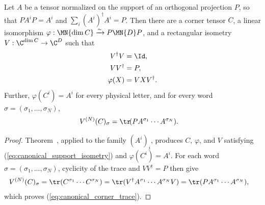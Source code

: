 \begin{lemma}%
    \label{thm:supported_corner_compression_isometry}
    \leanok

    Let $A$ be a tensor normalized on the support of an orthogonal projection
    $P$, so that $PA^iP=A^i$ and
    $\sum_i(A^i)^\dagger A^i=P$. Then there are a corner tensor $C$, a
    linear isomorphism
    $\varphi:\MN{\dim C}\xrightarrow{\sim}P\MN{D}P$, and a rectangular
    isometry $V:\C^{\dim C}\to\C^D$ such that
    \begin{align}
        V^\dagger V
         & =\Id,
        \notag           \\
        VV^\dagger
         & =P,
        \notag           \\
        \varphi(X)
         & =VXV^\dagger.
        \label{eq:canonical_support_isometry}
    \end{align}
    Further, $\varphi(C^i)=A^i$ for every physical letter, and for every word
    $\sigma=(\sigma_1,\ldots,\sigma_N)$,
    \begin{align}
        V^{(N)}(C)_\sigma
         & =
        \tr\!(PA^{\sigma_1}\cdots A^{\sigma_N}).
        \label{eq:canonical_corner_trace}
    \end{align}
    \begin{proof}\leanok

        Theorem~\cite[``Compression of a supported finite Kraus family'']{QICLean2026Blueprint},
        applied to the family $(A^i)_i$, produces $C$, $\varphi$, and $V$
        satisfying (\ref{eq:canonical_support_isometry}) and
        $\varphi(C^i)=A^i$. For each word $\sigma=(\sigma_1,\ldots,\sigma_N)$,
        cyclicity of the trace and $VV^\dagger=P$ then give
        \begin{align}
            V^{(N)}(C)_\sigma
             & =
            \tr(C^{\sigma_1}\cdots C^{\sigma_N})
            =
            \tr(V^\dagger A^{\sigma_1}\cdots A^{\sigma_N}V)
            =
            \tr(PA^{\sigma_1}\cdots A^{\sigma_N}),
            \notag
        \end{align}
        which proves (\ref{eq:canonical_corner_trace}).
    \end{proof}
\end{lemma}

